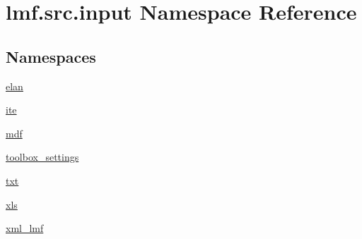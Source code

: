 \hypertarget{namespacelmf_1_1src_1_1input}{\section{lmf.\+src.\+input Namespace Reference}
\label{namespacelmf_1_1src_1_1input}
}
\subsection*{Namespaces}
\begin{DoxyCompactItemize}
\item 
 \hyperlink{namespacelmf_1_1src_1_1input_1_1elan}{elan}
\item 
 \hyperlink{namespacelmf_1_1src_1_1input_1_1ite}{ite}
\item 
 \hyperlink{namespacelmf_1_1src_1_1input_1_1mdf}{mdf}
\item 
 \hyperlink{namespacelmf_1_1src_1_1input_1_1toolbox__settings}{toolbox\+\_\+settings}
\item 
 \hyperlink{namespacelmf_1_1src_1_1input_1_1txt}{txt}
\item 
 \hyperlink{namespacelmf_1_1src_1_1input_1_1xls}{xls}
\item 
 \hyperlink{namespacelmf_1_1src_1_1input_1_1xml__lmf}{xml\+\_\+lmf}
\end{DoxyCompactItemize}
